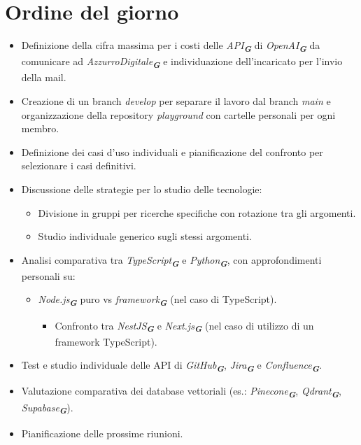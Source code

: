 

\section{Ordine del giorno}

\begin{itemize}
    \item Definizione della cifra massima per i costi delle \emph{API}\textsubscript{\textbf{\textit{G}}} di \emph{OpenAI}\textsubscript{\textbf{\textit{G}}} da comunicare ad \emph{AzzurroDigitale}\textsubscript{\textbf{\textit{G}}} e individuazione dell'incaricato per l'invio della mail.
    \item Creazione di un branch \emph{develop} per separare il lavoro dal branch \emph{main} e organizzazione della repository \emph{playground} con cartelle personali per ogni membro.
    \item Definizione dei casi d'uso individuali e pianificazione del confronto per selezionare i casi definitivi.
    \item Discussione delle strategie per lo studio delle tecnologie:
    \begin{itemize}
        \item Divisione in gruppi per ricerche specifiche con rotazione tra gli argomenti.
        \item Studio individuale generico sugli stessi argomenti.
    \end{itemize}
    \item Analisi comparativa tra \emph{TypeScript}\textsubscript{\textbf{\textit{G}}} e \emph{Python}\textsubscript{\textbf{\textit{G}}}, con approfondimenti personali su:
    \begin{itemize}
        \item \emph{Node.js}\textsubscript{\textbf{\textit{G}}} puro vs \emph{framework}\textsubscript{\textbf{\textit{G}}} (nel caso di TypeScript).
        \begin{itemize}
            \item Confronto tra \emph{NestJS}\textsubscript{\textbf{\textit{G}}} e \emph{Next.js}\textsubscript{\textbf{\textit{G}}} (nel caso di utilizzo di un framework TypeScript).
        \end{itemize}
    \end{itemize}
    \item Test e studio individuale delle API di \emph{GitHub}\textsubscript{\textbf{\textit{G}}}, \emph{Jira}\textsubscript{\textbf{\textit{G}}} e \emph{Confluence}\textsubscript{\textbf{\textit{G}}}.
    \item Valutazione comparativa dei database vettoriali (es.: \emph{Pinecone}\textsubscript{\textbf{\textit{G}}}, \emph{Qdrant}\textsubscript{\textbf{\textit{G}}}, \emph{Supabase}\textsubscript{\textbf{\textit{G}}}).
    \item Pianificazione delle prossime riunioni.
\end{itemize}
